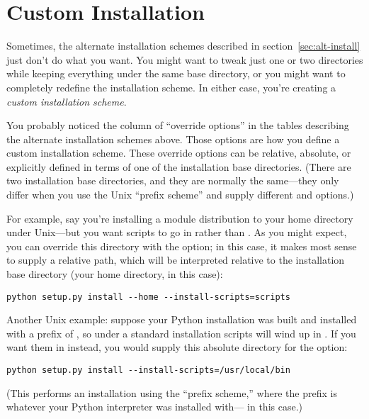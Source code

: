\documentclass{howto}
\begin{document}
\section{Custom Installation}
\label{sec:custom-install}

Sometimes, the alternate installation schemes described in
section~\ref{sec:alt-install} just don't do what you want.  You might
want to tweak just one or two directories while keeping everything under
the same base directory, or you might want to completely redefine the
installation scheme.  In either case, you're creating a \emph{custom
  installation scheme}.

You probably noticed the column of ``override options'' in the tables
describing the alternate installation schemes above.  Those options are
how you define a custom installation scheme.  These override options can
be relative, absolute, or explicitly defined in terms of one of the
installation base directories.  (There are two installation base
directories, and they are normally the same---they only differ when you
use the Unix ``prefix scheme'' and supply different  and
 options.)

For example, say you're installing a module distribution to your home
directory under Unix---but you want scripts to go in
 rather than .  As you might
expect, you can override this directory with the
 option; in this case, it makes most sense to
supply a relative path, which will be interpreted relative to the
installation base directory (your home directory, in this case):
\begin{verbatim}
python setup.py install --home --install-scripts=scripts
\end{verbatim}

Another Unix example: suppose your Python installation was built and
installed with a prefix of , so under a standard 
installation scripts will wind up in .  If
you want them in  instead, you would supply this
absolute directory for the  option:
\begin{verbatim}
python setup.py install --install-scripts=/usr/local/bin
\end{verbatim}
(This performs an installation using the ``prefix scheme,'' where the
prefix is whatever your Python interpreter was installed with---
 in this case.)
\end{document}
